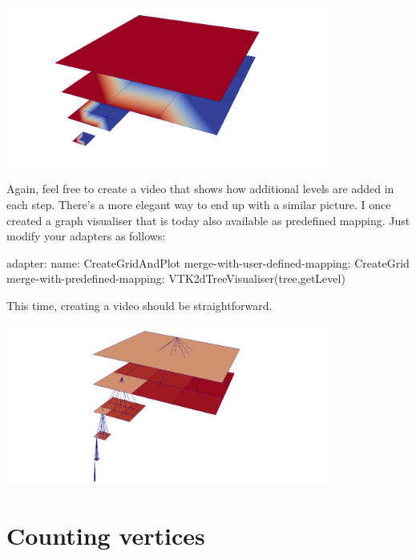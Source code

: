 \begin{center}
  \includegraphics[width=0.8\textwidth]{11_basics/tree00.png}
\end{center}

\noindent
Again, feel free to create a video that shows how additional levels are added in
each step.
There's a more elegant way to end up with a similar picture. 
I once created a graph visualiser that is today also available as predefined
mapping. Just modify your adapters as follows:

\begin{code}
adapter:
  name: CreateGridAndPlot
  merge-with-user-defined-mapping: CreateGrid
  merge-with-predefined-mapping: VTK2dTreeVisualiser(tree,getLevel)
\end{code}

\noindent
This time, creating a video should be straightforward.
\begin{center}
  \includegraphics[width=0.8\textwidth]{11_basics/tree01.png}
\end{center}

% 
% 


\section{Counting vertices}


